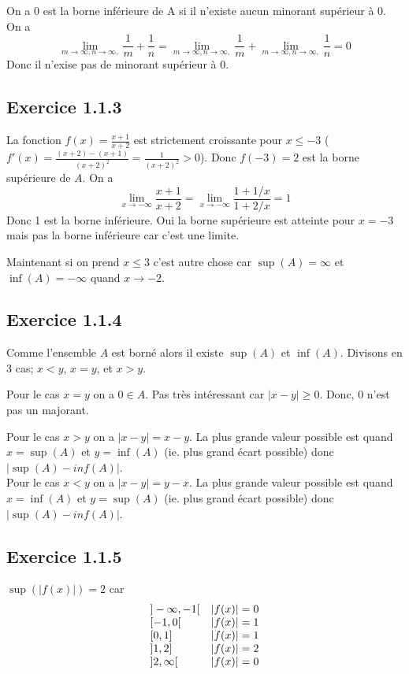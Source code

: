 \documentclass[]{book}
\theoremstyle{definition}
\begin{document}
On a 0 est la borne inf\'erieure de A si il n'existe aucun minorant sup\'erieur \`a $0$. On a 
$$\lim_{m \to \infty, n \to \infty,}\frac{1}{m} + \frac{1}{n} = \lim_{m \to \infty, n \to \infty,}\frac{1}{m} + \lim_{m \to \infty, n \to \infty,} \frac{1}{n} = 0$$
Donc il n'exise pas de minorant sup\'erieur \`a 0.


\subsection*{Exercice 1.1.3}
La fonction $f(x)=\frac{x+1}{x+2}$ est strictement croissante pour $x \leq -3$ ($f'(x) = \frac{(x+2)-(x+1)}{(x+2)^2} = \frac{1}{(x+2)^2} > 0$). Donc $f(-3) =  2$ est la borne sup\'erieure de $A$. On a 
$$\lim_{x \to -\infty} \frac{x+1}{x+2} = \lim_{x \to -\infty} \frac{1+1/x}{1+2/x} = 1$$
Donc 1 est la borne inf\'erieure.
Oui la borne sup\'erieure est atteinte pour $x=-3$ mais pas la borne inf\'erieure car c'est une limite.

Maintenant si on prend $x \leq 3$ c'est autre chose car $\sup(A) = \infty$ et $\inf(A) = -\infty$ quand $x \to -2$.

\subsection*{Exercice 1.1.4}
Comme l'ensemble $A$ est born\'e alors il existe $\sup(A)$ et $\inf(A)$. Divisons en 3 cas; $x < y$, $x=y$, et $x > y$.

Pour le cas $x=y$ on a $0 \in A$. Pas tr\`es int\'eressant car $|x-y| \geq 0$. Donc, 0 n'est pas un majorant. 

Pour le cas $x>y$ on a $|x-y| = x - y$. La plus grande valeur possible est quand $x=\sup(A)$ et $y = \inf(A)$ (ie. plus grand \'ecart possible) donc $|\sup(A)-inf(A)|$. \\
Pour le cas $x<y$ on a $|x-y| = y - x$. La plus grande valeur possible est quand $x=\inf(A)$ et $y = \sup(A)$ (ie. plus grand \'ecart possible) donc $|\sup(A)-inf(A)|$. \\


\subsection*{Exercice 1.1.5}
$\sup(|f(x)|) = 2$ car 
$$
\begin{array}{l l}
{]-\infty,-1[} & |f(x)| = 0 \\
{[-1,0[} & |f(x)| = 1 \\
{[0, 1]} & |f(x)| = 1 \\
{]1,2]} & |f(x)| = 2 \\
{]2,\infty[} & |f(x)| = 0 \\
\end{array}
$$
\end{document}
